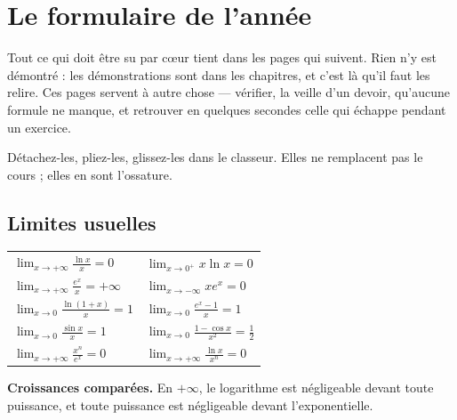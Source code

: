 \chapter{Le formulaire de l'année}

Tout ce qui doit être su par cœur tient dans les pages qui suivent. Rien n'y
est démontré : les démonstrations sont dans les chapitres, et c'est là qu'il
faut les relire. Ces pages servent à autre chose — vérifier, la veille d'un
devoir, qu'aucune formule ne manque, et retrouver en quelques secondes celle
qui échappe pendant un exercice.

Détachez-les, pliez-les, glissez-les dans le classeur. Elles ne remplacent pas
le cours ; elles en sont l'ossature.

\section*{Limites usuelles}

\begin{center}
\setlength{\tabcolsep}{10pt}
\renewcommand{\arraystretch}{1.6}
\begin{tabular}{@{}ll@{}}
\toprule
$\displaystyle\lim_{x\to+\infty}\frac{\ln x}{x} = 0$ &
$\displaystyle\lim_{x\to0^{+}}x\ln x = 0$ \\
$\displaystyle\lim_{x\to+\infty}\frac{e^{x}}{x} = +\infty$ &
$\displaystyle\lim_{x\to-\infty}xe^{x} = 0$ \\
$\displaystyle\lim_{x\to0}\frac{\ln(1+x)}{x} = 1$ &
$\displaystyle\lim_{x\to0}\frac{e^{x}-1}{x} = 1$ \\
$\displaystyle\lim_{x\to0}\frac{\sin x}{x} = 1$ &
$\displaystyle\lim_{x\to0}\frac{1-\cos x}{x^{2}} = \frac12$ \\
$\displaystyle\lim_{x\to+\infty}\frac{x^{n}}{e^{x}} = 0$ &
$\displaystyle\lim_{x\to+\infty}\frac{\ln x}{x^{n}} = 0$ \\
\bottomrule
\end{tabular}
\end{center}

\noindent
\textbf{Croissances comparées.} En $+\infty$, le logarithme est négligeable
devant toute puissance, et toute puissance est négligeable devant
l'exponentielle.

